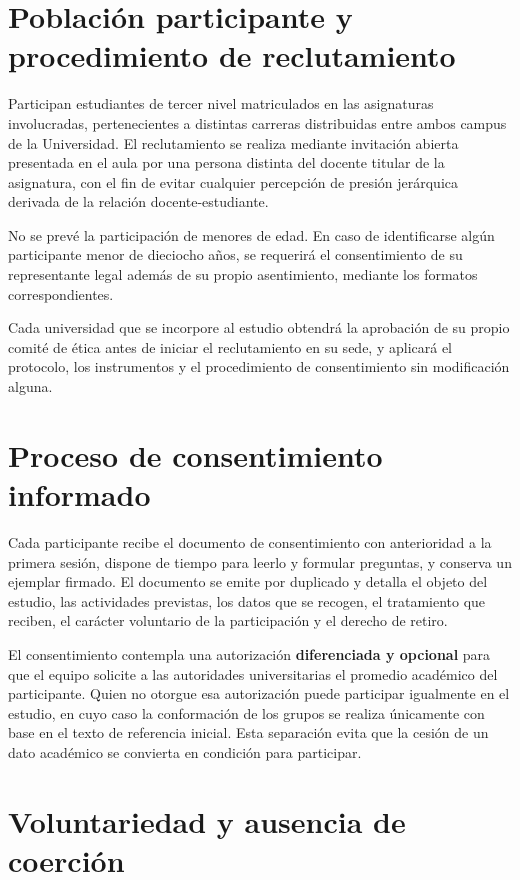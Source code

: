 \documentclass[11pt,a4paper]{article}
\begin{document}
\section{Poblaci\'on participante y procedimiento de reclutamiento}

Participan estudiantes de tercer nivel matriculados en las asignaturas involucradas, pertenecientes a distintas carreras distribuidas entre ambos campus de la Universidad. El reclutamiento se realiza mediante invitaci\'on abierta presentada en el aula por una persona distinta del docente titular de la asignatura, con el fin de evitar cualquier percepci\'on de presi\'on jer\'arquica derivada de la relaci\'on docente-estudiante.

No se prev\'e la participaci\'on de menores de edad. En caso de identificarse alg\'un participante menor de dieciocho a\~nos, se requerir\'a el consentimiento de su representante legal adem\'as de su propio asentimiento, mediante los formatos correspondientes.

Cada universidad que se incorpore al estudio obtendr\'a la aprobaci\'on de su propio comit\'e de \'etica antes de iniciar el reclutamiento en su sede, y aplicar\'a el protocolo, los instrumentos y el procedimiento de consentimiento sin modificaci\'on alguna.

\section{Proceso de consentimiento informado}

Cada participante recibe el documento de consentimiento con anterioridad a la primera sesi\'on, dispone de tiempo para leerlo y formular preguntas, y conserva un ejemplar firmado. El documento se emite por duplicado y detalla el objeto del estudio, las actividades previstas, los datos que se recogen, el tratamiento que reciben, el car\'acter voluntario de la participaci\'on y el derecho de retiro.

El consentimiento contempla una autorizaci\'on \textbf{diferenciada y opcional} para que el equipo solicite a las autoridades universitarias el promedio acad\'emico del participante. Quien no otorgue esa autorizaci\'on puede participar igualmente en el estudio, en cuyo caso la conformaci\'on de los grupos se realiza \'unicamente con base en el texto de referencia inicial. Esta separaci\'on evita que la cesi\'on de un dato acad\'emico se convierta en condici\'on para participar.

\section{Voluntariedad y ausencia de coerci\'on}
\end{document}
